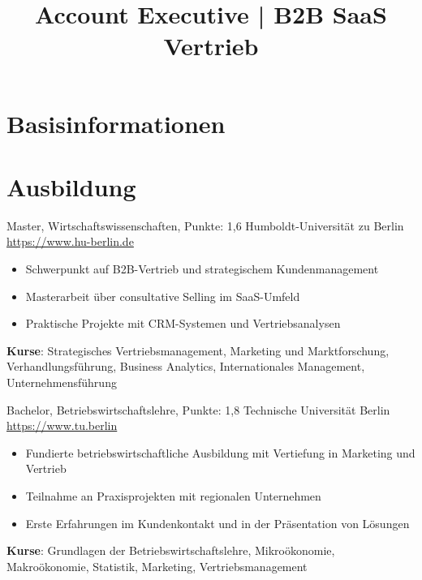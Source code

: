 \documentclass[a4paper, serif, 10pt]{moderncv}
\title{Account Executive | B2B SaaS Vertrieb}
\begin{document}
\maketitle

\section{Basisinformationen}

\section{Ausbildung}

        {Master, Wirtschaftswissenschaften, Punkte: 1,6}
        {Humboldt-Universität zu Berlin}
        {\url{https://www.hu-berlin.de}}
        {}
        {\begin{itemize}
\item Schwerpunkt auf B2B-Vertrieb und strategischem Kundenmanagement
\item Masterarbeit über consultative Selling im SaaS-Umfeld
\item Praktische Projekte mit CRM-Systemen und Vertriebsanalysen
\end{itemize}
\textbf{Kurse}: Strategisches Vertriebsmanagement, Marketing und Marktforschung, Verhandlungsführung, Business Analytics, Internationales Management, Unternehmensführung}

        {Bachelor, Betriebswirtschaftslehre, Punkte: 1,8}
        {Technische Universität Berlin}
        {\url{https://www.tu.berlin}}
        {}
        {\begin{itemize}
\item Fundierte betriebswirtschaftliche Ausbildung mit Vertiefung in Marketing und Vertrieb
\item Teilnahme an Praxisprojekten mit regionalen Unternehmen
\item Erste Erfahrungen im Kundenkontakt und in der Präsentation von Lösungen
\end{itemize}
\textbf{Kurse}: Grundlagen der Betriebswirtschaftslehre, Mikroökonomie, Makroökonomie, Statistik, Marketing, Vertriebsmanagement}
\end{document}
